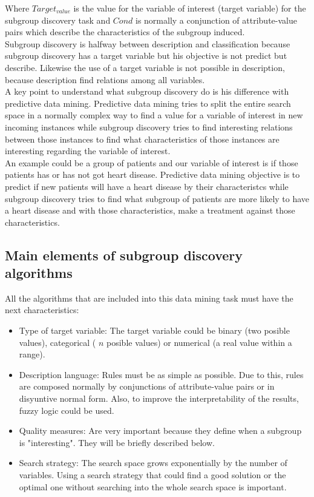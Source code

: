 \documentclass[]{article}
\begin{document}
Where $Target_{value}$ is the value for the variable of interest (target
variable) for the subgroup discovery task and $Cond$ is normally a
conjunction of attribute-value pairs which describe the characteristics
of the subgroup induced.\\Subgroup discovery is halfway between
description and classification because subgroup discovery has a target
variable but his objective is not predict but describe. Likewise the use
of a target variable is not possible in description, because description
find relations among all variables.\\A key point to understand what
subgroup discovery do is his difference with predictive data mining.
Predictive data mining tries to split the entire search space in a
normally complex way to find a value for a variable of interest in new
incoming instances while subgroup discovery tries to find interesting
relations between those instances to find what characteristics of those
instances are interesting regarding the variable of interest.\\An
example could be a group of patients and our variable of interest is if
those patients has or has not got heart disease. Predictive data mining
objective is to predict if new patients will have a heart disease by
their characteristcs while subgroup discovery tries to find what
subgroup of patients are more likely to have a heart disease and with
those characteristics, make a treatment against those characteristics.

\subsection{Main elements of subgroup discovery
algorithms}\label{main-elements-of-subgroup-discovery-algorithms}

All the algorithms that are included into this data mining task must
have the next characteristics:

\begin{itemize}
  
  \item Type of target variable: The target variable could be binary (two posible values), categorical ( $n$ posible values) or numerical (a real value within a range).
  \item Description language: Rules must be as simple as possible. Due to this, rules are composed normally by conjunctions of attribute-value pairs or in disyuntive normal form. Also, to improve the interpretability of the results, fuzzy logic could be used.
  \item Quality measures: Are very important because they define when a subgroup is "interesting". They will be briefly described below.
  \item Search strategy: The search space grows exponentially by the number of variables. Using a search strategy that could find a good solution or the optimal one without searching into the whole search space is important.
  
\end{itemize}
\end{document}
